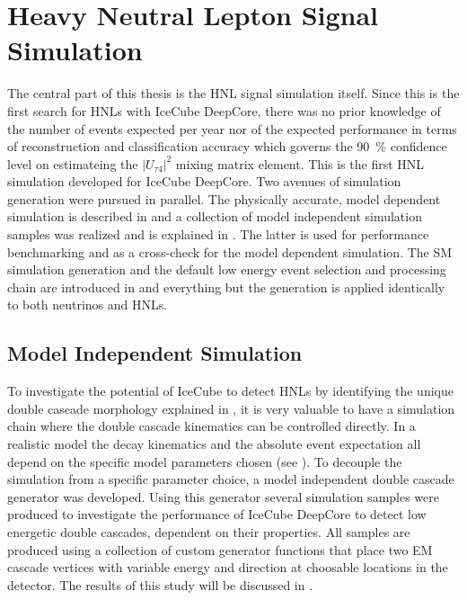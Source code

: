 \setchapterpreamble[u]{\margintoc}

\chapter{Heavy Neutral Lepton Signal Simulation}

The central part of this thesis is the HNL signal simulation itself. Since this is the first search for HNLs with IceCube DeepCore, there was no prior knowledge of the number of events expected per year nor of the expected performance in terms of reconstruction and classification accuracy which governs the \SI{90}{\percent} confidence level on estimateing the $|U_{\tau4}|^2$ mixing matrix element. This is the first HNL simulation developed for IceCube DeepCore. Two avenues of simulation generation were pursued in parallel. The physically accurate, model dependent simulation is described in  and a collection of model independent simulation samples was realized and is explained in . The latter is used for performance benchmarking and as a cross-check for the model dependent simulation. The SM simulation generation and the default low energy event selection and processing chain are introduced in  and everything but the generation is applied identically to both neutrinos and HNLs.


\section{Model Independent Simulation} 

To investigate the potential of IceCube to detect HNLs by identifying the unique double cascade morphology explained in , it is very valuable to have a simulation chain where the double cascade kinematics can be controlled directly. In a realistic model the decay kinematics and the absolute event expectation all depend on the specific model parameters chosen (see ). To decouple the simulation from a specific parameter choice, a model independent double cascade generator was developed. Using this generator several simulation samples were produced to investigate the performance of IceCube DeepCore to detect low energetic double cascades, dependent on their properties. All samples are produced using a collection of custom generator functions \cite{cascade_generator_functions} that place two EM cascade vertices with variable energy and direction at choosable locations in the detector. The results of this study will be discussed in .


